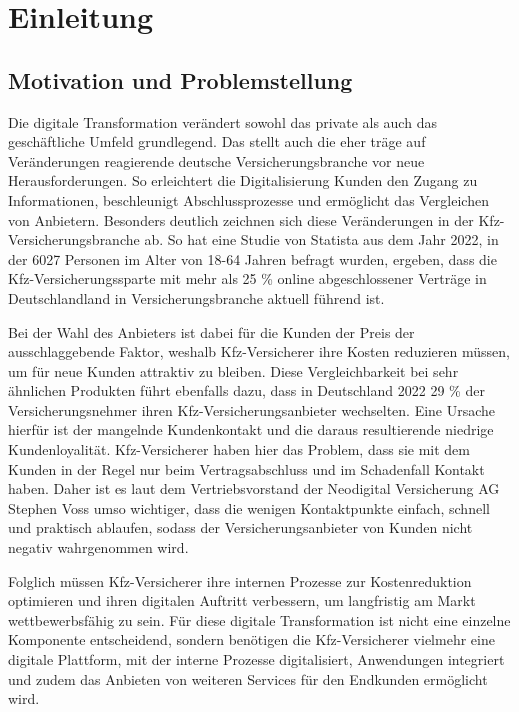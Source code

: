 \chapter{Einleitung}

\section{Motivation und Problemstellung}

Die digitale Transformation verändert sowohl das private als auch das geschäftliche Umfeld grundlegend. Das stellt auch die eher träge auf Veränderungen reagierende deutsche Versicherungsbranche vor neue Herausforderungen. So erleichtert die Digitalisierung Kunden den Zugang zu Informationen, beschleunigt Abschlussprozesse und ermöglicht das Vergleichen von Anbietern. Besonders deutlich zeichnen sich diese Veränderungen in der Kfz-Versicherungsbranche ab. So hat eine Studie von Statista aus dem Jahr 2022, in der 6027 Personen im Alter von 18-64 Jahren befragt wurden, ergeben, dass die Kfz-Versicherungssparte mit mehr als 25 \% online abgeschlossener Verträge in Deutschlandland in Versicherungsbranche aktuell führend ist.

Bei der Wahl des Anbieters ist dabei für die Kunden der Preis der ausschlaggebende Faktor, weshalb Kfz-Versicherer ihre Kosten reduzieren müssen, um für neue Kunden attraktiv zu bleiben. Diese Vergleichbarkeit bei sehr ähnlichen Produkten führt ebenfalls dazu, dass in Deutschland 2022 29 \% der Versicherungsnehmer ihren Kfz-Versicherungsanbieter wechselten. Eine Ursache hierfür ist der mangelnde Kundenkontakt und die daraus resultierende niedrige Kundenloyalität. Kfz-Versicherer haben hier das Problem, dass sie mit dem Kunden in der Regel nur beim Vertragsabschluss und im Schadenfall Kontakt haben. Daher ist es laut dem Vertriebsvorstand der Neodigital Versicherung AG Stephen Voss umso wichtiger, dass die wenigen Kontaktpunkte einfach, schnell und praktisch ablaufen, sodass der Versicherungsanbieter von Kunden nicht negativ wahrgenommen wird. 

Folglich müssen Kfz-Versicherer ihre internen Prozesse zur Kostenreduktion optimieren und ihren digitalen Auftritt verbessern, um  langfristig am Markt wettbewerbsfähig zu sein. Für diese digitale Transformation ist nicht eine einzelne Komponente entscheidend, sondern benötigen die Kfz-Versicherer vielmehr eine digitale Plattform, mit der interne Prozesse digitalisiert, Anwendungen integriert und zudem das Anbieten von weiteren Services für den Endkunden ermöglicht wird.

